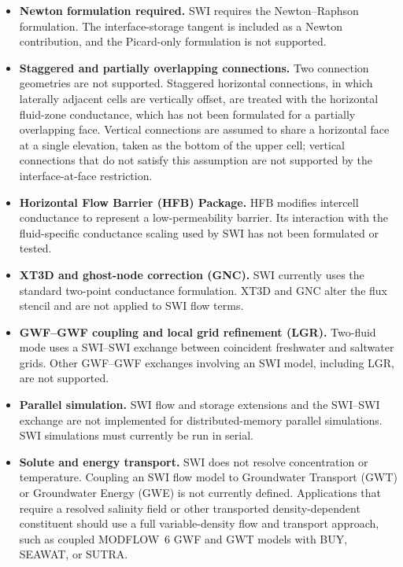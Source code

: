 \begin{itemize}

\item \textbf{Newton formulation required.} SWI requires the \mf Newton--Raphson formulation. The interface-storage tangent is included as a Newton contribution, and the Picard-only formulation is not supported.

\item \textbf{Staggered and partially overlapping connections.} Two connection geometries are not supported. Staggered horizontal connections, in which laterally adjacent cells are vertically offset, are treated with the horizontal fluid-zone conductance, which has not been formulated for a partially overlapping face. Vertical connections are assumed to share a horizontal face at a single elevation, taken as the bottom of the upper cell; vertical connections that do not satisfy this assumption are not supported by the interface-at-face restriction.

\item \textbf{Horizontal Flow Barrier (HFB) Package.} HFB modifies intercell conductance to represent a low-permeability barrier. Its interaction with the fluid-specific conductance scaling used by SWI has not been formulated or tested.

\item \textbf{XT3D and ghost-node correction (GNC).} SWI currently uses the standard two-point conductance formulation. XT3D and GNC alter the flux stencil and are not applied to SWI flow terms.

\item \textbf{GWF--GWF coupling and local grid refinement (LGR).} Two-fluid mode uses a SWI--SWI exchange between coincident freshwater and saltwater grids. Other GWF--GWF exchanges involving an SWI model, including LGR, are not supported.

\item \textbf{Parallel simulation.} SWI flow and storage extensions and the SWI--SWI exchange are not implemented for distributed-memory parallel simulations. SWI simulations must currently be run in serial.

\item \textbf{Solute and energy transport.} SWI does not resolve concentration or temperature. Coupling an SWI flow model to Groundwater Transport (GWT) or Groundwater Energy (GWE) is not currently defined. Applications that require a resolved salinity field or other transported density-dependent constituent should use a full variable-density flow and transport approach, such as coupled MODFLOW~6 GWF and GWT models with BUY, SEAWAT, or SUTRA.


\end{itemize}
